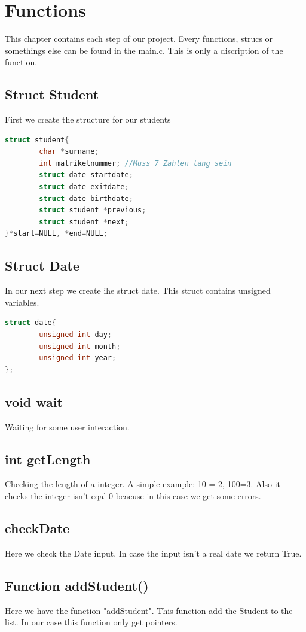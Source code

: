 \documentclass[a4paper, 11pt, oneside]{book} %
\begin{document}
\chapter{Functions} 
This chapter contains each step of our project. Every functions, strucs or somethings else can be found in the main.c. This is only a discription of the function.
 \section{Struct Student}
 First we create the structure for our students
\begin{lstlisting}[language=C]
	struct student{
    	char *surname;
    	int matrikelnummer; //Muss 7 Zahlen lang sein
    	struct date startdate;
    	struct date exitdate;
    	struct date birthdate;
    	struct student *previous;
    	struct student *next;
}*start=NULL, *end=NULL;
\end{lstlisting}

\section{Struct Date}
In our next step we create ihe struct date. This struct contains unsigned variables.
\begin{lstlisting}[language=C]
	struct date{
        unsigned int day;
        unsigned int month;
        unsigned int year;
};
\end{lstlisting}
\section{void wait}
Waiting for some user interaction.
\section{int getLength}
Checking the length of a integer. A simple example: 10 = 2, 100=3. Also it checks the integer isn't eqal 0 beacuse in this case we get some errors.

\section{checkDate}
Here we check the Date input. In case the input isn't a real date we return True.

\section{Function addStudent()}
Here we have the function "addStudent". This function add the Student to the list. In our case this function only get pointers.
\end{document}
